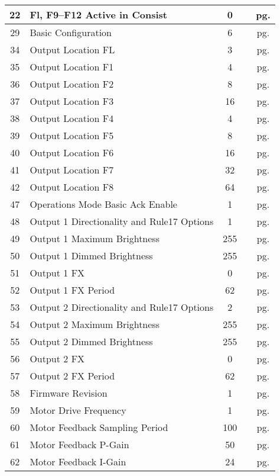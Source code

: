 \documentclass[12pt,letterpaper,draft]{memoir} %
\begin{document}
\begin{center}
\begin{longtable}{|c|l|c|c|c|}
22&Fl, F9--F12 Active in Consist&0&&pg. \pageref{CV22} \\ \hline
29&Basic Configuration&6&&pg. \pageref{CV29} \\ \hline
34&Output Location FL&3&&pg. \pageref{CV34} \\ \hline
35&Output Location F1&4&&pg. \pageref{CV35} \\ \hline
36&Output Location F2&8&&pg. \pageref{CV36} \\ \hline
37&Output Location F3&16&&pg. \pageref{CV37} \\ \hline
38&Output Location F4&4&&pg. \pageref{CV38} \\ \hline
39&Output Location F5&8&&pg. \pageref{CV39} \\ \hline
40&Output Location F6&16&&pg. \pageref{CV40} \\ \hline
41&Output Location F7&32&&pg. \pageref{CV41} \\ \hline
42&Output Location F8&64&&pg. \pageref{CV42} \\ \hline
47&Operations Mode Basic Ack Enable&1&&pg. \pageref{CV47} \\ \hline
48&Output 1 Directionality and Rule17 Options&1&&pg. \pageref{CV48} \\ \hline
49&Output 1 Maximum Brightness&255&&pg. \pageref{CV49} \\ \hline
50&Output 1 Dimmed Brightness&255&&pg. \pageref{CV50} \\ \hline
51&Output 1 FX&0&&pg. \pageref{CV51} \\ \hline
52&Output 1 FX Period&62&&pg. \pageref{CV52} \\ \hline
53&Output 2 Directionality and Rule17 Options&2&&pg. \pageref{CV53} \\ \hline
54&Output 2 Maximum Brightness&255&&pg. \pageref{CV54} \\ \hline
55&Output 2 Dimmed Brightness&255&&pg. \pageref{CV55} \\ \hline
56&Output 2 FX&0&&pg. \pageref{CV56} \\ \hline
57&Output 2 FX Period&62&&pg. \pageref{CV57} \\ \hline
58&Firmware Revision&1&&pg. \pageref{CV58} \\ \hline
59&Motor Drive Frequency&1&&pg. \pageref{CV59} \\ \hline
60&Motor Feedback Sampling Period&100&&pg. \pageref{CV60} \\ \hline
61&Motor Feedback P-Gain&50&&pg. \pageref{CV61} \\ \hline
62&Motor Feedback I-Gain&24&&pg. \pageref{CV62} \\ \hline

\end{longtable}
\end{center}
\end{document}

